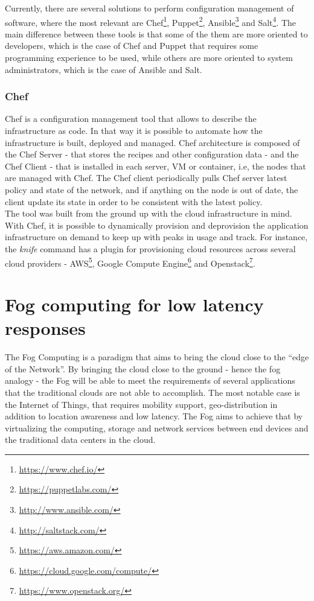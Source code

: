 Currently, there are several solutions to perform configuration management of software, where the
most relevant are Chef\footnote{\url{https://www.chef.io/}}, Puppet\footnote{\url{https://puppetlabs.com/}},
Ansible\footnote{\url{http://www.ansible.com/}} and Salt\footnote{\url{http://saltstack.com/}}. The main difference
between these tools is that some of the them are more oriented to developers, which is the case of Chef and
Puppet that requires some programming experience to be used, while others are more oriented to system
administrators, which is the case of Ansible and Salt.\\

\subsubsection{Chef}
\label{subs:chef}
Chef is a configuration management tool that allows to describe the infrastructure as code.
In that way it is possible to automate how the infrastructure is built, deployed and managed.
Chef architecture is composed of the Chef Server - that stores the recipes and other configuration
data - and the Chef Client - that is installed in each server, \gls{VM} or container, i.e, the nodes that
are managed with Chef. The Chef client periodically pulls Chef server latest policy and state of the
network, and if anything on the node is out of date, the client update its state in order to be
consistent with the latest policy.\\

The tool was built from the ground up with the cloud infrastructure in mind. With Chef, it is possible
to dynamically provision and deprovision the application infrastructure on demand to keep up with
peaks in usage and track. For instance, the \textit{knife} command has a plugin for provisioning cloud
resources across several cloud providers - \gls{AWS}\footnote{\url{https://aws.amazon.com/}}, Google
Compute Engine\footnote{\url{https://cloud.google.com/compute/}} and Openstack\footnote{\url{https://www.openstack.org/}}.

\section{Fog computing for low latency responses}
\label{sec:fog_computing}
The Fog Computing \cite{bonomi2012fog} is a paradigm that aims to bring the cloud close to the ``edge
of the Network''. By bringing the cloud close to the ground - hence the fog analogy - the Fog will be
able to meet the requirements of several applications that the traditional clouds are not able to
accomplish. The most notable case is the Internet of Things, that requires mobility support,
geo-distribution in addition to location awareness and low latency. The Fog aims to achieve that by
virtualizing the computing, storage and network services between end devices and the
traditional data centers in the cloud.\\


